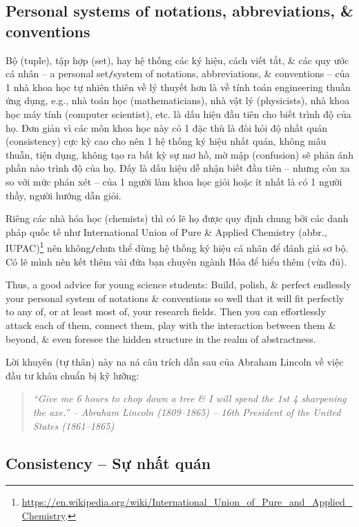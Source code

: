 \documentclass[12pt,oneside]{book}
\begin{document}
\subsection{Personal systems of notations, abbreviations, \& conventions}
Bộ (tuple), tập hợp (set), hay hệ thống các ký hiệu, cách viết tắt, \& các quy ước cá nhân -- a personal set{\tt/}system of notations, abbreviations, \& conventions -- của 1 nhà khoa học tự nhiên thiên về lý thuyết hơn là về tính toán engineering thuần ứng dụng, e.g., nhà toán học (mathematicians), nhà vật lý (physicists), nhà khoa học máy tính (computer scientist), etc. là dấu hiệu đầu tiên cho biết trình độ của họ. Đơn giản vì các môn khoa học này có 1 đặc thù là đòi hỏi độ nhất quán (consistency) cực kỳ cao cho nên 1 hệ thống ký hiệu nhất quán, không mâu thuẫn, tiện dụng, không tạo ra bất kỳ sự mơ hồ, mờ mập (confusion) sẽ phản ánh phần nào trình độ của họ. Đấy là dấu hiệu dễ nhận biết đầu tiên -- nhưng còn xa so với mức phán xét -- của 1 người làm khoa học giỏi hoặc ít nhất là có 1 người thầy, người hướng dẫn giỏi.

Riêng các nhà hóa học (chemists) thì có lẽ họ được quy định chung bởi các danh pháp quốc tế như International Union of Pure \& Applied Chemistry (abbr., IUPAC)\footnote{\url{https://en.wikipedia.org/wiki/International_Union_of_Pure_and_Applied_Chemistry}.} nên không{\tt/}chưa thể dùng hệ thống ký hiệu cá nhân để đánh giá sơ bộ. Có lẽ mình nên kết thêm vài đứa bạn chuyên ngành Hóa để hiểu thêm (vừa đủ).

Thus, a good advice for young science students: Build, polish, \& perfect endlessly your personal system of notations \& conventions so well that it will fit perfectly to any of, or at least most of, your research fields. Then you can effortlessly attack each of them, connect them, play with the interaction between them \& beyond, \& even foresee the hidden structure in the realm of abstractness.

Lời khuyên (tự thân) này na ná câu trích dẫn sau của Abraham Lincoln về việc đầu tư khâu chuẩn bị kỹ lưỡng:
\begin{quote}\it
	``Give me 6 hours to chop down a tree \& I will spend the 1st 4 sharpening the axe.'' -- {\sc Abraham Lincoln} (1809--1865) -- 16th President of the United States (1861--1865)
\end{quote}

\subsection{Consistency -- Sự nhất quán}
\end{document}
